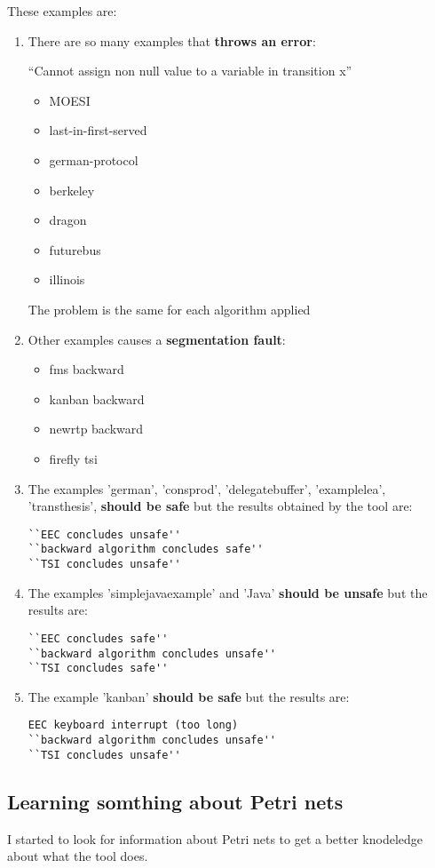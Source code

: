 \documentclass[nochap]{apuntes}
\begin{document}
These examples are:
\begin{enumerate}
\item There are so many examples that \textbf{throws an error}:

``Cannot assign non null value to a variable in transition x''
\begin{itemize}
\item MOESI
\item last-in-first-served
\item german-protocol
\item berkeley
\item dragon
\item futurebus
\item illinois
\end{itemize}
The problem is the same for each algorithm applied

\item Other examples causes a \textbf{segmentation fault}:
\begin{itemize}
\item fms backward
\item kanban backward
\item newrtp backward
\item firefly tsi
\end{itemize}
\item The examples 'german', 'consprod', 'delegatebuffer', 'examplelea', 'transthesis', \textbf{should be  safe} but the results obtained by the tool are:
\begin{verbatim}
``EEC concludes unsafe''
``backward algorithm concludes safe''
``TSI concludes unsafe''
\end{verbatim}

\item The examples 'simplejavaexample' and 'Java' \textbf{should be unsafe} but the results are:
\begin{verbatim}
``EEC concludes safe''
``backward algorithm concludes unsafe''
``TSI concludes safe''
\end{verbatim}

\item The example 'kanban' \textbf{should be safe }but the results are:
\begin{verbatim}
EEC keyboard interrupt (too long)
``backward algorithm concludes unsafe''
``TSI concludes unsafe''
\end{verbatim}
\end{enumerate}

\subsection{Learning somthing about Petri nets}
I started to look for information about Petri nets to get a better knodeledge about what the tool does.
\end{document}
